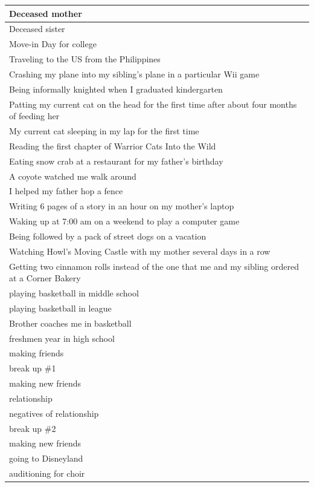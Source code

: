 \documentclass[
  .7em,
  letterpaper,
  DIV=11,
  numbers=noendperiod]{scrartcl}
\begin{document}
\begin{table}
\begin{tabular}{l}
\hline
Deceased mother\\
\hline
Deceased sister\\
\hline
Move-in Day for college\\
\hline
Traveling to the US from the Philippines\\
\hline
Crashing my plane into my sibling's plane in a particular Wii game\\
\hline
Being informally knighted when I graduated kindergarten\\
\hline
Patting my current cat on the head for the first time after about four months of feeding her\\
\hline
My current cat sleeping in my lap for the first time\\
\hline
Reading the first chapter of Warrior Cats Into the Wild\\
\hline
Eating snow crab at a restaurant for my father's birthday\\
\hline
A coyote watched me walk around\\
\hline
I helped my father hop a fence\\
\hline
Writing 6 pages of a story in an hour on my mother's laptop\\
\hline
Waking up at 7:00 am on a weekend to play a computer game\\
\hline
Being followed by a pack of street dogs on a vacation\\
\hline
Watching Howl's Moving Castle with my mother several days in a row\\
\hline
Getting two cinnamon rolls instead of the one that me and my sibling ordered at a Corner Bakery\\
\hline
playing basketball in middle school\\
\hline
playing basketball in league\\
\hline
Brother coaches me in basketball\\
\hline
freshmen year in high school\\
\hline
making friends\\
\hline
break up \#1\\
\hline
making new friends\\
\hline
relationship\\
\hline
negatives of relationship\\
\hline
break up \#2\\
\hline
making new friends\\
\hline
going to Disneyland\\
\hline
auditioning for choir\\

\end{tabular}
\end{table}
\end{document}
